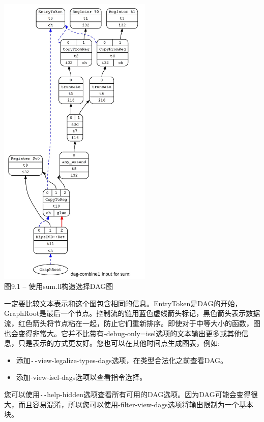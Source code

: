 \hspace*{\fill} \par %
\begin{center}
\includegraphics[width=0.55\textwidth]{content/3/chapter9/images/1.jpg}\\
图9.1 – 使用sum.ll构造选择DAG图
\end{center}

一定要比较文本表示和这个图包含相同的信息。EntryToken是DAG的开始，GraphRoot是最后一个节点。控制流的链用蓝色虚线箭头标记，黑色箭头表示数据流，红色箭头将节点粘在一起，防止它们重新排序。即使对于中等大小的函数，图也会变得非常大。它并不比带有-debug-only=isel选项的文本输出更多或其他信息，只是表示的方式更友好。您也可以在其他时间点生成图表，例如:\par

\begin{itemize}
\item 添加\verb|--|view-legalize-types-dags选项，在类型合法化之前查看DAG。
\item 添加-view-isel-dags选项以查看指令选择。
\end{itemize}

您可以使用\verb|--|help-hidden选项查看所有可用的DAG选项。因为DAG可能会变得很大，而且容易混淆，所以您可以使用-filter-view-dags选项将输出限制为一个基本块。\par

